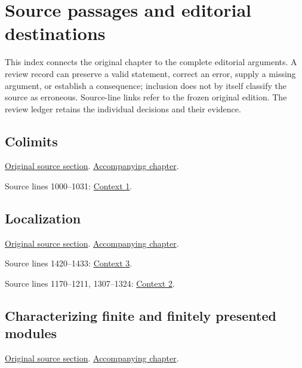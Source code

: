 \section{Source passages and editorial destinations}
This index connects the original chapter to the complete editorial arguments. A review record can preserve a valid statement, correct an error, supply a missing argument, or establish a consequence; inclusion does not by itself classify the source as erroneous. Source-line links refer to the frozen original edition. The review ledger retains the individual decisions and their evidence.

\subsection{Colimits}
\hypertarget{algebra-source-section-colimits}{}
\noindent\href{https://github.com/stacks/stacks-project/blob/a04446e57ec1fbc252a871afcec7752fb2807b14/algebra.tex\#L702}{Original source section}. \href{algebra.pdf\#nameddest=section-colimits}{Accompanying chapter}.

\begin{AlgebraSourceRoutes}
\item[ALGEBRA-RECON-005] Source lines 1000--1031: \hyperlink{algebra-context-001}{Context 1}.
\end{AlgebraSourceRoutes}

\subsection{Localization}
\hypertarget{algebra-source-section-localization}{}
\noindent\href{https://github.com/stacks/stacks-project/blob/a04446e57ec1fbc252a871afcec7752fb2807b14/algebra.tex\#L1038}{Original source section}. \href{algebra.pdf\#nameddest=section-localization}{Accompanying chapter}.

\begin{AlgebraSourceRoutes}
\item[ALGEBRA-RECON-017] Source lines 1420--1433: \hyperlink{algebra-context-003}{Context 3}.
\item[ALGEBRA-RECON-018] Source lines 1170--1211, 1307--1324: \hyperlink{algebra-context-002}{Context 2}.
\end{AlgebraSourceRoutes}

\subsection{Characterizing finite and finitely presented modules}
\hypertarget{algebra-source-section-colim-and-hom}{}
\noindent\href{https://github.com/stacks/stacks-project/blob/a04446e57ec1fbc252a871afcec7752fb2807b14/algebra.tex\#L1580}{Original source section}. \href{algebra.pdf\#nameddest=section-colim-and-hom}{Accompanying chapter}.

